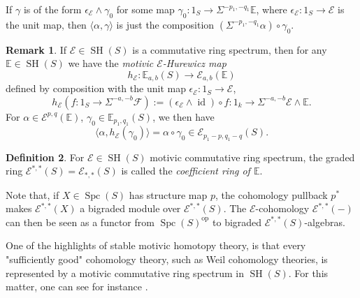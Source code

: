 \documentclass[10pt]{amsart}
\theoremstyle{definition}
\newtheorem{defn}{Definition}[section]
\newtheorem{rmk}[defn]{Remark}
\theoremstyle{plain}
\numberwithin{equation}{section}
\newcommand{\0}{\emptyset}
\newcommand{\sE}{{\mathcal E}}
\newcommand{\sF}{{\mathcal F}}
\newcommand{\E}{{\mathbb E}}
\newcommand{\SH}{{\operatorname{SH}}}
\newcommand{\Spc}{{\operatorname{Spc}}}
\newcommand{\id}{{\operatorname{id}}}
\newcommand{\op}{{\operatorname{op}}}
\begin{document}
If $\gamma$ is of the form $\epsilon_\sE\wedge \gamma_0$ for some map $\gamma_0:1_S\to \Sigma^{-p_1, -q_1}\E$, where $\epsilon_\sE:1_S\to \sE$ is the unit map, then $\langle\alpha,\gamma\rangle$ is just the composition $(\Sigma^{-p_1,-q_1} \alpha)\circ \gamma_0$. 

\begin{rmk}\label{rmk:HurewiczMap} If $\sE\in \SH(S)$ is a commutative ring spectrum, then for any $\E \in \SH(S)$ we have the {\em motivic $\sE$-Hurewicz map}
\[
h_\sE:\E_{a,b}(S)\to \sE_{a,b}(\E)
\]
defined by composition with the unit map $\epsilon_\sE:1_S\to \sE$,
\[
h_\sE(f:1_S\to \Sigma^{-a,-b}\sF):=(\epsilon_\sE\wedge\id)\circ f:1_k\to \Sigma^{-a,-b}\sE\wedge \E.
\]
For $\alpha\in \sE^{p,q}(\E)$, $\gamma_0\in \E_{p_1,q_1}(S)$, we then have
\[
\langle \alpha,h_\sE(\gamma_0)\rangle =\alpha\circ \gamma_0\in \sE_{p_1-p,q_1-q}(S).
\]
\end{rmk}

\begin{defn}
\label{defn:coefficientRing}
    For $\sE \in \SH(S)$ motivic commutative ring spectrum, the graded ring $\sE^{*,*}(S)=\sE_{*,*}(S)$ is called the \emph{coefficient ring of $\E$}.
\end{defn}

Note that, if $X \in \Spc(S)$ has structure map $p$, the cohomology pullback $p^*$ makes $\sE^{*,*}(X)$ a bigraded module over $\sE^{*,*}(S)$. The $\sE$-cohomology $\sE^{*,*}(-)$ can then be seen as a functor from $\Spc(S)^\op$ to bigraded $\sE^{*,*}(S)$-algebras.

One of the highlights of stable motivic homotopy theory, is that every "sufficiently good" cohomology theory, such as Weil cohomology theories, is represented by a motivic commutative ring spectrum in $\SH(S)$. For this matter, one can see for instance \cite{CisDeg:Weil}.
\end{document}
